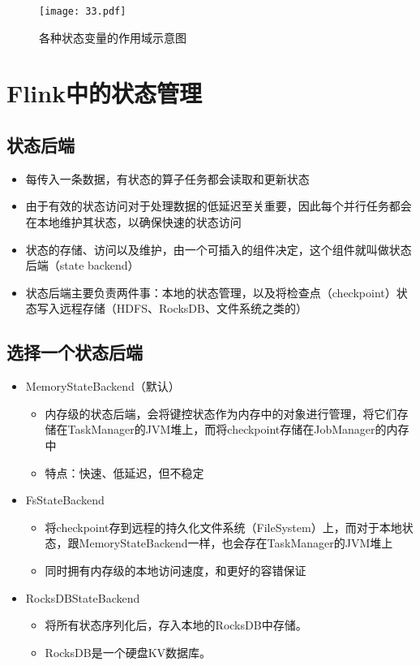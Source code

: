 \documentclass[cn,11pt,chinese]{elegantbook}
\begin{document}
\begin{figure}[htbp]
  \centering
  \texttt{[image: 33.pdf]}
  \caption{各种状态变量的作用域示意图}
\end{figure}

\section{Flink中的状态管理}

\subsection{状态后端}

\begin{itemize}
  \item 每传入一条数据，有状态的算子任务都会读取和更新状态
  \item 由于有效的状态访问对于处理数据的低延迟至关重要，因此每个并行任务都会在本地维护其状态，以确保快速的状态访问
  \item 状态的存储、访问以及维护，由一个可插入的组件决定，这个组件就叫做状态后端（state backend）
  \item 状态后端主要负责两件事：本地的状态管理，以及将检查点（checkpoint）状态写入远程存储（HDFS、RocksDB、文件系统之类的）
\end{itemize}

\subsection{选择一个状态后端}

\begin{itemize}
  \item MemoryStateBackend（默认）
    \begin{itemize}
      \item 内存级的状态后端，会将键控状态作为内存中的对象进行管理，将它们存储在TaskManager的JVM堆上，而将checkpoint存储在JobManager的内存中
      \item 特点：快速、低延迟，但不稳定
    \end{itemize}
  \item FsStateBackend
    \begin{itemize}
      \item 将checkpoint存到远程的持久化文件系统（FileSystem）上，而对于本地状态，跟MemoryStateBackend一样，也会存在TaskManager的JVM堆上
      \item 同时拥有内存级的本地访问速度，和更好的容错保证
    \end{itemize}
  \item RocksDBStateBackend
    \begin{itemize}
      \item 将所有状态序列化后，存入本地的RocksDB中存储。
      \item RocksDB是一个硬盘KV数据库。
    \end{itemize}
\end{itemize}
\end{document}

